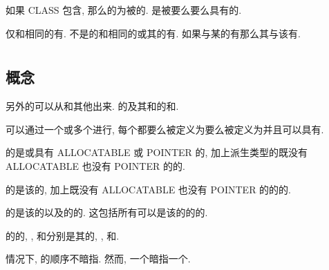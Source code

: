 如果 CLASS \TypeSpecifier{}包含\Type{}\Name{}, 那么\Polymorphic{}\Entity{}的\DeclaredType{}为被\Specify{}的\Type{}. \DeclaredType{}是\Data{}\Entity{}被要么\Explicitly{}要么\Implicitly{}\Declare{}具有的\Type{}.

\Nonpolymorphic{}\Entity{}仅和相同\DeclaredType{}的\Entity{}有\Type{}\Compatibility{}. 不是\UnlimitedPolymorphic{}\Entity{}的\Polymorphic{}\Entity{}和相同\DeclaredType{}的或其\Extension{}的\Entity{}有\Type{}\Compatibility{}. 如果\Entity{}与某\Type{}的\Entity{}有\Type{}\Compatibility{}那么其与该\Type{}有\Type{}\Compatibility{}.

\section{\DerivedType{}}

\subsection{\DerivedType{}概念}

另外的\Type{}可以从\IntrinsicType{}和其他\DerivedType{}\Derive{}出来. \Type{}\Definition{}\Define{}\Type{}的\Name{}及其\Component{}和\TypeBound{}\Procedure{}的\Name{}和\Attribute{}.

\DerivedType{}可以通过一个或多个\TypeParameter{}进行\Parameterize{}, 每个\TypeParameter{}都要么被定义为\Kind{}\TypeParameter{}要么被定义为\Length{}\TypeParameter{}并且可以具有\Default{}\Value{}.

\DerivedType{}的\UltimateComponent{}是\IntrinsicType{}或具有 ALLOCATABLE \Attribute{}或 POINTER \Attribute{}的\Component{}, 加上派生类型的既没有 ALLOCATABLE \Attribute{}也没有 POINTER \Attribute{}的\Component{}的\UltimateComponent{}.

\DerivedType{}的\DirectComponent{}是该\Type{}的\Component{}, 加上既没有 ALLOCATABLE \Attribute{}也没有 POINTER \Attribute{}的\DerivedType{}的\Component{}的\DirectComponent{}.

\DerivedType{}的\PotentialSubobjectComponent{}是该\Type{}的\Nonpointer{}\Component{}以及\DerivedType{}的\Nonpointer{}\Component{}的\PotentialSubobjectComponent{}. 这包括所有可以是该\Type{}的\Object{}的\Subobject{}的\Component{}.

\DerivedType{}的\Object{}的\Component{}, \DirectComponent{}, \PotentialSubobjectComponent{}和\UltimateComponent{}分别是其\Type{}的\Component{}, \DirectComponent{}, \PotentialSubobjectComponent{}和\UltimateComponent{}.

\Default{}情况下, \Component{}\Definition{}的顺序不暗指\Storage{}\Sequence{}. 然而, 一个\Sequence{}\Type{}暗指一个\Storage{}\Sequence{}.

